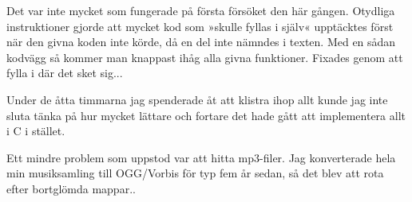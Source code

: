 \documentclass[a4paper, 11pt]{article}
\begin{document}
Det var inte mycket som fungerade på första försöket den här gången.
Otydliga instruktioner gjorde att mycket kod som »skulle fyllas i själv« upptäcktes först när den givna koden inte körde,
då en del inte nämndes i texten. Med en sådan kodvägg så kommer man knappast ihåg alla givna funktioner. Fixades genom att fylla i där
det sket sig...

Under de åtta timmarna jag spenderade åt att klistra ihop allt kunde jag inte sluta tänka på hur mycket lättare och fortare det hade gått
att implementera allt i C i stället.

Ett mindre problem som uppstod var att hitta mp3-filer. Jag konverterade hela min musiksamling till OGG/Vorbis för typ fem år sedan, så det blev att 
rota efter bortglömda mappar..
\end{document}
